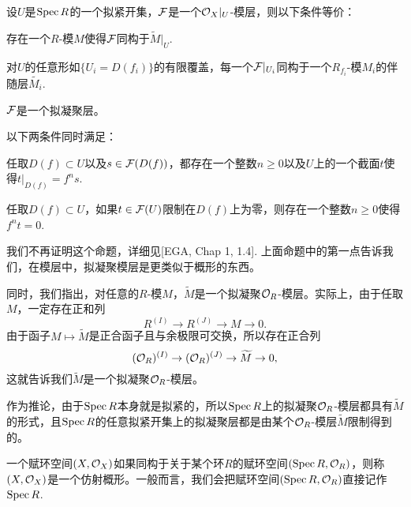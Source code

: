 \begin{pro}[素谱上的拟凝聚层]\label{niningju}
设$U$是$\operatorname{Spec} R$的一个拟紧开集，$\mathcal{F}$是一个$\mathcal{O}_X|_U$-模层，则以下条件等价：
\begin{compactenum}[~~~(1).]
\item 存在一个$R$-模$M$使得$\mathcal{F}$同构于$\widetilde{M}|_U$.
\item 对$U$的任意形如$\{U_i=D(f_i)\}$的有限覆盖，每一个$\mathcal{F}|_{U_i}$同构于一个$R_{f_i}$-模$M_i$的伴随层$\widetilde{M_i}$.
\item $\mathcal{F}$是一个拟凝聚层。
\item 以下两条件同时满足：
\begin{compactenum}[\hspace{-1em}1.]
\item 任取$D(f)\subset U$以及$s\in \mathcal{F}(D(f))$，都存在一个整数$n\geq 0$以及$U$上的一个截面$t$使得$t|_{D(f)}=f^ns$.
\item 任取$D(f)\subset U$，如果$t\in \mathcal{F}(U)$限制在$D(f)$上为零，则存在一个整数$n\geq 0$使得$f^nt=0$.
\end{compactenum}
\end{compactenum}
\end{pro}

我们不再证明这个命题，详细见[EGA, Chap 1, 1.4]. 上面命题中的第一点告诉我们，在模层中，拟凝聚模层是更类似于概形的东西。

同时，我们指出，对任意的$R$-模$M$，$\widetilde{M}$是一个拟凝聚$\mathcal{O}_R$-模层。实际上，由于任取$M$，一定存在正和列
\[
	R^{(I)}\to R^{(J)}\to M\to 0.
\]
由于函子$M\mapsto \widetilde{M}$是正合函子且与余极限可交换，所以存在正合列
\[
	(\mathcal{O}_R)^{(I)}\to (\mathcal{O}_R)^{(J)}\to \widetilde{M}\to 0,
\]
这就告诉我们$\widetilde{M}$是一个拟凝聚$\mathcal{O}_R$-模层。

作为推论，由于$\operatorname{Spec} R$本身就是拟紧的，所以$\operatorname{Spec} R$上的拟凝聚$\mathcal{O}_R$-模层都具有$\widetilde{M}$的形式，且$\operatorname{Spec} R$的任意拟紧开集上的拟凝聚层都是由某个$\mathcal{O}_R$-模层$\widetilde{M}$限制得到的。

\begin{para}[仿射概形]
一个赋环空间$(X,\mathcal{O}_X)$如果同构于关于某个环$R$的赋环空间$(\operatorname{Spec} R,\mathcal{O}_R)$，则称$(X,\mathcal{O}_X)$是一个仿射概形。一般而言，我们会把赋环空间$(\operatorname{Spec} R,\mathcal{O}_R)$直接记作$\operatorname{Spec} R$.

\end{para}

